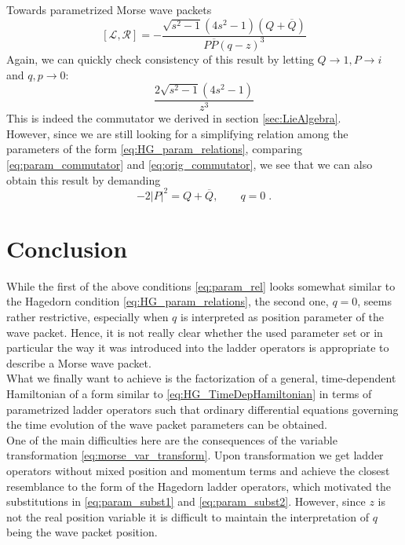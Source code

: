 \begin{chapter}{Towards parametrized Morse wave packets}
\begin{equation}
    \label{eq:param_commutator}
    [\mathcal{L},\mathcal{R}]=-\frac{\sqrt{s^2-1}(4s^2-1)(Q+\overline{Q})}{P\overline{P}(q-z)^3}
\end{equation}
Again, we can quickly check consistency of this result by letting $Q\to 1, P\to i$ and $q,p\to 0$: 
\begin{equation}
    \label{eq:orig_commutator}
    \frac{2\sqrt{s^2-1}(4s^2-1) }{z^3}
\end{equation}
This is indeed the commutator we derived in section \ref{sec:LieAlgebra}.\\

However, since we are still looking for a simplifying relation among the parameters of the form \eqref{eq:HG_param_relations}, comparing \eqref{eq:param_commutator} and \eqref{eq:orig_commutator}, we see that we can also obtain this result by demanding
\begin{equation}
\label{eq:param_rel}
    -2|P|^2=Q+\overline{Q},\qquad q=0\;.
\end{equation}

\section{Conclusion}
\label{sec:Conclusion}
While the first of the above conditions \eqref{eq:param_rel} looks somewhat similar to the 
Hagedorn condition \eqref{eq:HG_param_relations}, the second one, $q=0$, seems rather restrictive, 
especially when $q$ is interpreted as position parameter of the wave packet. Hence, it is not really clear
whether the used parameter set or in particular the way it was introduced into the ladder operators is appropriate to describe a Morse wave packet.\\

What we finally want to achieve is the factorization of a general, time-dependent Hamiltonian
of a form similar to \eqref{eq:HG_TimeDepHamiltonian} in terms of parametrized ladder operators such that
ordinary differential equations governing the time evolution of the wave packet parameters can be obtained.\\

One of the main difficulties here are the consequences of the variable transformation \eqref{eq:morse_var_transform}. Upon transformation we get ladder operators without mixed position and 
momentum terms and achieve the closest resemblance to the form of the Hagedorn ladder operators,
which motivated the substitutions in \eqref{eq:param_subst1} and \eqref{eq:param_subst2}. 
However, since $z$ is not the real position variable it is difficult to maintain the
interpretation of $q$ being the wave packet position.\\


\end{chapter}
